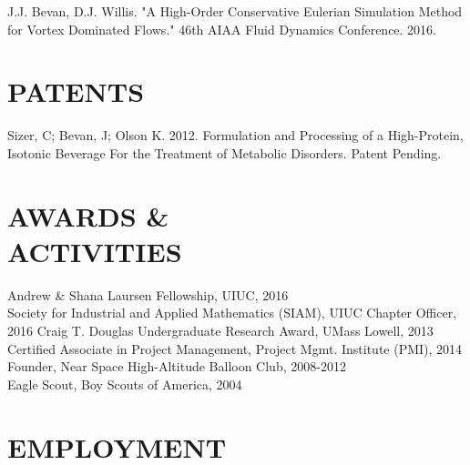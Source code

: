 \documentclass[margin, 10pt]{res} %
\begin{document}
\begin{resume}
J.J. Bevan, D.J. Willis. "A High-Order Conservative Eulerian Simulation Method for Vortex Dominated Flows." 46th AIAA Fluid Dynamics Conference. 2016.

\section{PATENTS} 

Sizer, C; Bevan, J; Olson K. 2012. Formulation and Processing of a High-Protein, Isotonic Beverage For the Treatment of Metabolic Disorders. Patent Pending.
 

\section{AWARDS \& \\ACTIVITIES} 

Andrew \& Shana Laursen Fellowship, UIUC, 2016\\
Society for Industrial and Applied Mathematics (SIAM), UIUC Chapter Officer, 2016
Craig T. Douglas Undergraduate Research Award, UMass Lowell, 2013\\
Certified Associate in Project Management, Project Mgmt. Institute (PMI), 2014\\
Founder, Near Space High-Altitude Balloon Club, 2008-2012\\
Eagle Scout, Boy Scouts of America, 2004
 
\section{EMPLOYMENT}


\end{resume}
\end{document}
